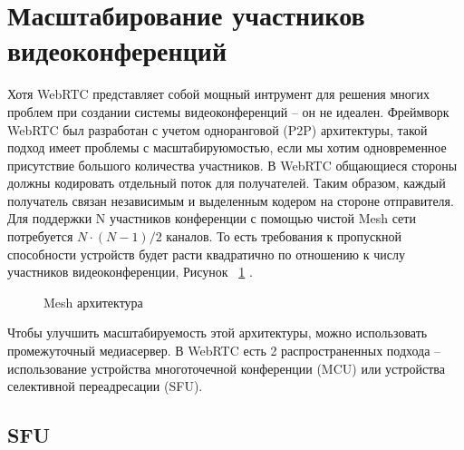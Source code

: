 \section{Масштабирование участников видеоконференций}

Хотя WebRTC представляет собой мощный интрумент для решения многих проблем при создании системы видеоконференций -- он не идеален. Фреймворк WebRTC был разработан с учетом одноранговой (P2P) архитектуры, такой подход имеет проблемы с масштабируюмостью, если мы хотим одновременное присутствие большого количества участников. В WebRTC общающиеся стороны должны кодировать отдельный поток для получателей. Таким образом, каждый получатель связан независимым и выделенным кодером на стороне отправителя. Для поддержки N участников конференции с помощью чистой Mesh сети потребуется $N \cdot (N - 1) / 2$ каналов. То есть требования к пропускной способности устройств будет расти квадратично по отношению к числу участников видеоконференции, Рисунок ~\ref{mesh} \cite{v17}.

\begin{figure}[ht]
\begin{center}

\caption{
\label{mesh}
     Mesh архитектура}
\end {center}
\end {figure}

Чтобы улучшить масштабируемость этой архитектуры, можно использовать промежуточный медиасервер. В WebRTC есть 2 распространенных подхода -- использование устройства многоточечной конференции (MCU) или устройства селективной переадресации (SFU).

\subsection{SFU}

